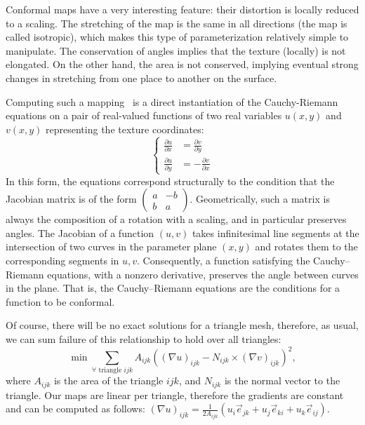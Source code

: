 \documentclass[notitlepage,oneside]{book}
\begin{document}
Conformal maps have a very interesting feature:  their distortion is locally reduced to a scaling.
The stretching of the map is the same in all directions (the map is called isotropic), which makes this type of parameterization relatively simple to manipulate.
The conservation of angles implies that the texture (locally) is not elongated.
On the other hand, the area is not conserved, implying eventual strong changes in stretching from one place to another on the surface.

Computing such a mapping~\cite{levy2002least} is a direct instantiation of the Cauchy-Riemann equations on a pair of real-valued functions of two real variables $u(x,y)$ and $v(x,y)$ representing the texture coordinates:
$$\left\{
 \begin{array}{rl}
\frac{\partial u}{\partial x} &= \frac{\partial v}{\partial y} \\
\frac{\partial u}{\partial y} &= -\frac{\partial v}{\partial x}
\end{array}
\right.
$$
In this form, the equations correspond structurally to the condition that the Jacobian matrix is of the form
$ \begin{pmatrix}a & -b \\ b &a\end{pmatrix} $.
Geometrically, such a matrix is always the composition of a rotation with a scaling, and in particular preserves angles.
The Jacobian of a function $(u, v)$ takes infinitesimal line segments at the intersection of two curves in the parameter plane $(x,y)$ and rotates them to the corresponding segments in $u,v$.
Consequently, a function satisfying the Cauchy–Riemann equations, with a nonzero derivative, preserves the angle between curves in the plane.
That is, the Cauchy–Riemann equations are the conditions for a function to be conformal.

Of course, there will be no exact solutions for a triangle mesh, therefore, as usual, we can sum failure of this relationship to hold over all triangles:
$$\min \sum\limits_{\forall\text{~triangle~} ijk} A_{ijk}\left((\nabla u)_{ijk} - N_{ijk}\times(\nabla v)_{ijk}\right)^2,$$
where $A_{ijk}$ is the area of the triangle $ijk$, and $N_{ijk}$ is the normal vector to the triangle. Our maps are linear per triangle, therefore the gradients are constant and can be computed as follows:
$(\nabla u)_{ijk} = \frac{1}{2 A_{ijk}}(u_i \vec{e}_{jk} + u_j\vec{e}_{ki} + u_k\vec{e}_{ij})$.
\end{document}
